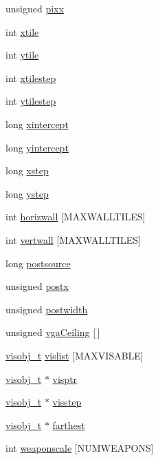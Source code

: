 \begin{DoxyCompactItemize}
unsigned \hyperlink{WL__DRAW_8C_a2f208ffbe5bce68b88b0be14b31b646e}{pixx}
\item 
int \hyperlink{WL__DRAW_8C_a3e30cba2a41cd8cc4bbd542406740bdb}{xtile}
\item 
int \hyperlink{WL__DRAW_8C_ae627669bd6e5d021526a8a9afcaf03bb}{ytile}
\item 
int \hyperlink{WL__DRAW_8C_a859e49ee6e2571ae53825f209eb02a78}{xtilestep}
\item 
int \hyperlink{WL__DRAW_8C_aaef66a8ff1d1f8a60c2fd40d4a76c9a9}{ytilestep}
\item 
long \hyperlink{WL__DRAW_8C_abb6bfab91af01d48a7a6875c45f2105d}{xintercept}
\item 
long \hyperlink{WL__DRAW_8C_ab6f450db5349ed31e39d8e079faa6a2a}{yintercept}
\item 
long \hyperlink{WL__DRAW_8C_aaaab702387622616cf225e9293ae0dfb}{xstep}
\item 
long \hyperlink{WL__DRAW_8C_aa296ced144d6a8bc7e2ccb3f08a10373}{ystep}
\item 
int \hyperlink{WL__DRAW_8C_a03061b527831bee701c5bcde03fce672}{horizwall} \mbox{[}MAXWALLTILES\mbox{]}
\item 
int \hyperlink{WL__DRAW_8C_a547c957a9b11d3cdf23e669f0ca0bbdc}{vertwall} \mbox{[}MAXWALLTILES\mbox{]}
\item 
long \hyperlink{WL__DRAW_8C_a5c3da61f4f3a18106264fea7208c84cd}{postsource}
\item 
unsigned \hyperlink{WL__DRAW_8C_a04274d2d5024d95f76a7c66cc176f0e2}{postx}
\item 
unsigned \hyperlink{WL__DRAW_8C_a9cdf6d376906876ee5303bf1c419c053}{postwidth}
\item 
unsigned \hyperlink{WL__DRAW_8C_a4bac1032a2c87cdff1512670555bc698}{vgaCeiling} \mbox{[}$\,$\mbox{]}
\item 
\hyperlink{structvisobj__t}{visobj\_\-t} \hyperlink{WL__DRAW_8C_a439daa25724f2dd91247db7c7aa6c36d}{vislist} \mbox{[}MAXVISABLE\mbox{]}
\item 
\hyperlink{structvisobj__t}{visobj\_\-t} $\ast$ \hyperlink{WL__DRAW_8C_af3f4cde3f75a6b7f26bb1a3cfd2fe488}{visptr}
\item 
\hyperlink{structvisobj__t}{visobj\_\-t} $\ast$ \hyperlink{WL__DRAW_8C_a69e17f09bcc87eeb8d2d73ad447fe5c8}{visstep}
\item 
\hyperlink{structvisobj__t}{visobj\_\-t} $\ast$ \hyperlink{WL__DRAW_8C_ad309c8f7ec06b57630f2cc2cc9d67570}{farthest}
\item 
int \hyperlink{WL__DRAW_8C_ae3f7f0ee388ee88187e292b982e09359}{weaponscale} \mbox{[}NUMWEAPONS\mbox{]}
\end{DoxyCompactItemize}


